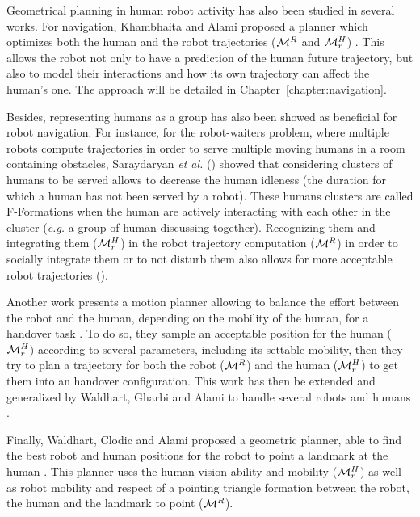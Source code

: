 \documentclass[a4paper,11pt,twoside]{StyleThese}
\begin{document}
Geometrical planning in human robot activity has also been studied in several works. For navigation, Khambhaita and Alami proposed a planner which optimizes both the human and the robot trajectories ($\mathcal{M}^R$ and $\mathcal{M}^H_r$) \cite{khambhaita_viewing_2017}. This allows the robot not only to have a prediction of the human future trajectory, but also to model their interactions and how its own trajectory can affect the human's one. The approach will be detailed in Chapter~\ref{chapter:navigation}.

Besides, representing humans as a group has also been showed as beneficial for robot navigation. For instance, for the robot-waiters problem, where multiple robots compute trajectories in order to serve multiple moving humans in a room containing obstacles, Saraydaryan \textit{et al.} (\cite{saraydaryan2015robots}) showed that considering clusters of humans to be served allows to decrease the human idleness (the duration for which a human has not been served by a robot). These humans clusters are called F-Formations when the human are actively interacting with each other in the cluster (\textit{e.g.} a group of human discussing together). Recognizing them and integrating them ($\mathcal{M}^H_r$) in the robot trajectory computation ($\mathcal{M}^R$) in order to socially integrate them or to not disturb them also allows for more acceptable robot trajectories (\cite{althaus2004navigation}).

Another work presents a motion planner allowing to balance the effort between the robot and the human, depending on the mobility of the human, for a handover task \cite{mainprice2012sharing}. To do so, they sample an acceptable position for the human ($\mathcal{M}^H_r$) according to several parameters, including its settable mobility, then they try to plan a trajectory for both the robot ($\mathcal{M}^R$) and the human ($\mathcal{M}^H_r$) to get them into an handover configuration. This work has then be extended and generalized by Waldhart, Gharbi and Alami to handle several robots and humans \cite{waldhart2015planning}.

Finally, Waldhart, Clodic and Alami proposed a geometric planner, able to find the best robot and human positions for the robot to point a landmark at the human \cite{waldhart_reasoning_shared_2019}. This planner uses the human vision ability and mobility ($\mathcal{M}^H_r$) as well as robot mobility and respect of a pointing triangle formation between the robot, the human and the landmark to point ($\mathcal{M}^R$).
\end{document}
